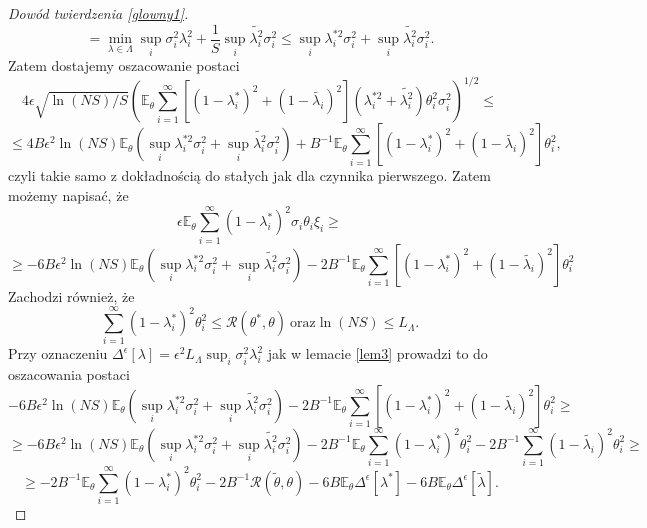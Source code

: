 \documentclass{article}
\begin{document}
\begin{proof}[Dowód twierdzenia \ref{glowny1}]
\begin{displaymath}
\end{displaymath}
\begin{displaymath}
=\min_{\lambda\in\Lambda}\sup_i\sigma_i^2\lambda_i^2+\frac{1}{S}\sup_i\tilde{\lambda_i^2}\sigma_i^2\leq\sup_i\lambda_i^{*2}\sigma_i^2+\sup_i\tilde{\lambda_i^2}\sigma_i^2.
\end{displaymath}
Zatem dostajemy oszacowanie postaci
\begin{displaymath}
4\epsilon\sqrt{\ln (NS)/S}\left(\mathbb{E}_{\theta}\sum_{i=1}^{\infty}[(1-\lambda_i^*)^2+(1-\tilde{\lambda_i})^2](\lambda_i^{*2}+\tilde{\lambda_i^2})\theta_i^2\sigma_i^2\right)^{1/2}\leq
\end{displaymath}
\begin{displaymath}
\leq 4B\epsilon^2 \ln (NS)\mathbb{E}_{\theta}\left(\sup_i\lambda_i^{*2}\sigma_i^2+\sup_i\tilde{\lambda_i^2}\sigma_i^2\right)+B^{-1}\mathbb{E}_{\theta}\sum_{i=1}^{\infty}[(1-\lambda_i^*)^2+(1-\tilde{\lambda_i})^2]\theta_i^2,
\end{displaymath}
czyli takie samo z dokładnością do stałych jak dla czynnika pierwszego. Zatem możemy napisać, że 
\begin{displaymath}
\epsilon\mathbb{E}_{\theta}\sum_{i=1}^{\infty}(1-\lambda_i^*)^2\sigma_i\theta_i\xi_i\geq 
\end{displaymath}
\begin{displaymath}
\geq -6B\epsilon^2 \ln (NS)\mathbb{E}_{\theta}\left(\sup_i\lambda_i^{*2}\sigma_i^2+\sup_i\tilde{\lambda_i^2}\sigma_i^2\right)-2B^{-1}\mathbb{E}_{\theta}\sum_{i=1}^{\infty}[(1-\lambda_i^*)^2+(1-\tilde{\lambda_i})^2]\theta_i^2
\end{displaymath}
Zachodzi również, że
\begin{displaymath}
\sum_{i=1}^{\infty}(1-\lambda_i^{*})^2\theta_i^2\leq \mathcal{R}(\theta^*,\theta)\ \textrm{oraz} \ln (NS)\leq L_{\Lambda}.
\end{displaymath}
Przy oznaczeniu $\Delta^{\epsilon}[\lambda]=\epsilon^2L_{\Lambda}\sup_i\sigma_i^2\lambda_i^2$ jak w lemacie \ref{lem3} prowadzi to do oszacowania postaci
\begin{displaymath}
-6B\epsilon^2 \ln (NS)\mathbb{E}_{\theta}\left(\sup_i\lambda_i^{*2}\sigma_i^2+\sup_i\tilde{\lambda_i^2}\sigma_i^2\right)-2B^{-1}\mathbb{E}_{\theta}\sum_{i=1}^{\infty}[(1-\lambda_i^*)^2+(1-\tilde{\lambda_i})^2]\theta_i^2\geq
\end{displaymath}
\begin{displaymath}
\geq -6B\epsilon^2 \ln (NS)\mathbb{E}_{\theta}\left(\sup_i\lambda_i^{*2}\sigma_i^2+\sup_i\tilde{\lambda_i^2}\sigma_i^2\right)-2B^{-1}\mathbb{E}_{\theta}\sum_{i=1}^{\infty}(1-\lambda_i^*)^2\theta_i^2-2B^{-1}\sum_{i=1}^{\infty}(1-\tilde{\lambda_i})^2\theta_i^2\geq
\end{displaymath}
\begin{equation}\label{szacowanie1}
\geq -2B^{-1}\mathbb{E}_{\theta}\sum_{i=1}^{\infty}(1-\lambda_i^*)^2\theta_i^2-2B^{-1}\mathcal{R}(\tilde{\theta},\theta)-6B\mathbb{E}_{\theta}\Delta^{\epsilon}[\lambda^*]-6B\mathbb{E}_{\theta}\Delta^{\epsilon}[\tilde{\lambda}].
\end{equation}


\end{proof}
\end{document}
